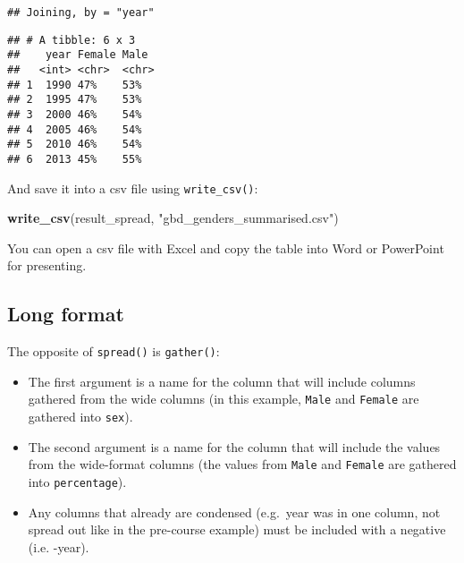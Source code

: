 \documentclass[]{book}
\makeatletter
\newenvironment{Shaded}{\begin{snugshade}}{\end{snugshade}}
\newcommand{\KeywordTok}[1]{\textcolor[rgb]{0.13,0.29,0.53}{\textbf{#1}}}
\newcommand{\DataTypeTok}[1]{\textcolor[rgb]{0.13,0.29,0.53}{#1}}
\newcommand{\DecValTok}[1]{\textcolor[rgb]{0.00,0.00,0.81}{#1}}
\newcommand{\StringTok}[1]{\textcolor[rgb]{0.31,0.60,0.02}{#1}}
\newcommand{\OperatorTok}[1]{\textcolor[rgb]{0.81,0.36,0.00}{\textbf{#1}}}
\newcommand{\NormalTok}[1]{#1}
\providecommand{\tightlist}{%
  \setlength{\itemsep}{0pt}\setlength{\parskip}{0pt}}
\newenvironment{kframe}{%
\medskip{}
\setlength{\fboxsep}{.8em}
 \def\at@end@of@kframe{}%
 \ifinner\ifhmode%
  \def\at@end@of@kframe{\end{minipage}}%
  \begin{minipage}{\columnwidth}%
 \fi\fi%
 \def\FrameCommand##1{\hskip\@totalleftmargin \hskip-\fboxsep
 \colorbox{shadecolor}{##1}\hskip-\fboxsep
     \hskip-\linewidth \hskip-\@totalleftmargin \hskip\columnwidth}%
 \MakeFramed {\advance\hsize-\width
   \@totalleftmargin\z@ \linewidth\hsize
   \@setminipage}}%
 {\par\unskip\endMakeFramed%
 \at@end@of@kframe}
\renewenvironment{Shaded}{\begin{kframe}}{\end{kframe}}
\theoremstyle{definition}
\theoremstyle{definition}
\theoremstyle{definition}
\theoremstyle{remark}
\makeatother
\begin{document}
\begin{verbatim}
## Joining, by = "year"
\end{verbatim}

\begin{Shaded}
\end{Shaded}

\begin{verbatim}
## # A tibble: 6 x 3
##    year Female Male 
##   <int> <chr>  <chr>
## 1  1990 47%    53%  
## 2  1995 47%    53%  
## 3  2000 46%    54%  
## 4  2005 46%    54%  
## 5  2010 46%    54%  
## 6  2013 45%    55%
\end{verbatim}

And save it into a csv file using \texttt{write\_csv()}:

\begin{Shaded}
\begin{Highlighting}[]
\KeywordTok{write_csv}\NormalTok{(result_spread, }\StringTok{"gbd_genders_summarised.csv"}\NormalTok{)}
\end{Highlighting}
\end{Shaded}

You can open a csv file with Excel and copy the table into Word or
PowerPoint for presenting.

\subsection{Long format}\label{long-format}

The opposite of \texttt{spread()} is \texttt{gather()}:

\begin{itemize}
\tightlist
\item
  The first argument is a name for the column that will include columns
  gathered from the wide columns (in this example, \texttt{Male} and
  \texttt{Female} are gathered into \texttt{sex}).
\item
  The second argument is a name for the column that will include the
  values from the wide-format columns (the values from \texttt{Male} and
  \texttt{Female} are gathered into \texttt{percentage}).
\item
  Any columns that already are condensed (e.g.~year was in one column,
  not spread out like in the pre-course example) must be included with a
  negative (i.e. -year).
\end{itemize}
\end{document}
